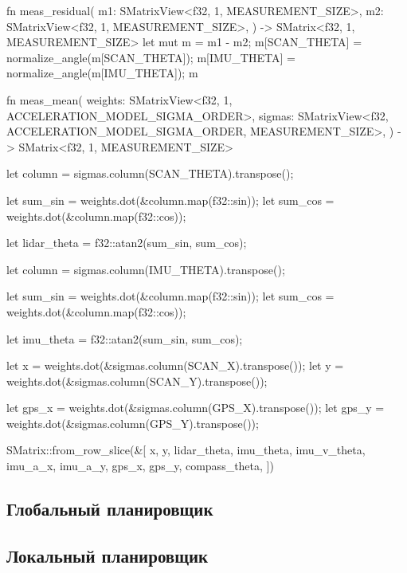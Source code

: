 \begin{lslisting}
fn meas_residual(
    m1: SMatrixView<f32, 1, MEASUREMENT_SIZE>,
    m2: SMatrixView<f32, 1, MEASUREMENT_SIZE>,
) -> SMatrix<f32, 1, MEASUREMENT_SIZE> {
    let mut m = m1 - m2;
    m[SCAN_THETA] = normalize_angle(m[SCAN_THETA]);
    m[IMU_THETA] = normalize_angle(m[IMU_THETA]);
    m
}


fn meas_mean(
    weights: SMatrixView<f32, 1, ACCELERATION_MODEL_SIGMA_ORDER>,
    sigmas: SMatrixView<f32, ACCELERATION_MODEL_SIGMA_ORDER, MEASUREMENT_SIZE>,
) -> SMatrix<f32, 1, MEASUREMENT_SIZE> {
    let column = sigmas.column(SCAN_THETA).transpose();

    let sum_sin = weights.dot(&column.map(f32::sin));
    let sum_cos = weights.dot(&column.map(f32::cos));

    let lidar_theta = f32::atan2(sum_sin, sum_cos);

    let column = sigmas.column(IMU_THETA).transpose();

    let sum_sin = weights.dot(&column.map(f32::sin));
    let sum_cos = weights.dot(&column.map(f32::cos));

    let imu_theta = f32::atan2(sum_sin, sum_cos);

    let x = weights.dot(&sigmas.column(SCAN_X).transpose());
    let y = weights.dot(&sigmas.column(SCAN_Y).transpose());

    let gps_x = weights.dot(&sigmas.column(GPS_X).transpose());
    let gps_y = weights.dot(&sigmas.column(GPS_Y).transpose());

    SMatrix::from_row_slice(&[
        x,
        y,
        lidar_theta,
        imu_theta,
        imu_v_theta,
        imu_a_x,
        imu_a_y,
        gps_x,
        gps_y,
        compass_theta,
    ])
}
\end{lslisting}

\subsection{Глобальный планировщик}



\subsection{Локальный планировщик}
